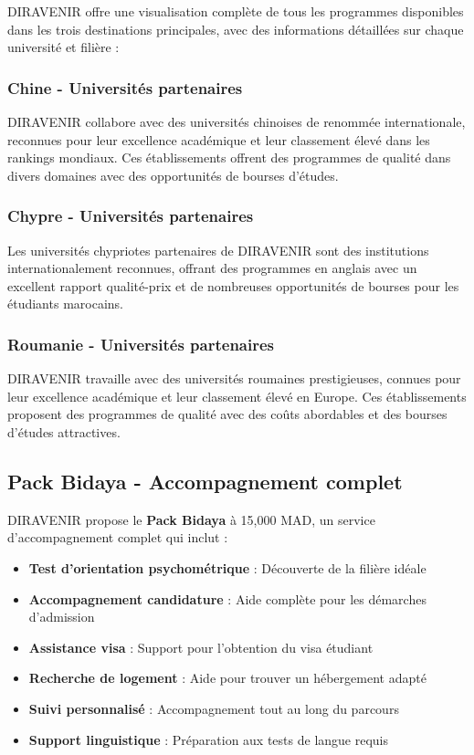 \documentclass[12pt,a4paper]{report}
\begin{document}
DIRAVENIR offre une visualisation complète de tous les programmes disponibles dans les trois destinations principales, avec des informations détaillées sur chaque université et filière :

\subsubsection{Chine - Universités partenaires}

DIRAVENIR collabore avec des universités chinoises de renommée internationale, reconnues pour leur excellence académique et leur classement élevé dans les rankings mondiaux. Ces établissements offrent des programmes de qualité dans divers domaines avec des opportunités de bourses d'études.

\subsubsection{Chypre - Universités partenaires}

Les universités chypriotes partenaires de DIRAVENIR sont des institutions internationalement reconnues, offrant des programmes en anglais avec un excellent rapport qualité-prix et de nombreuses opportunités de bourses pour les étudiants marocains.

\subsubsection{Roumanie - Universités partenaires}

DIRAVENIR travaille avec des universités roumaines prestigieuses, connues pour leur excellence académique et leur classement élevé en Europe. Ces établissements proposent des programmes de qualité avec des coûts abordables et des bourses d'études attractives.

\subsection{Pack Bidaya - Accompagnement complet}

DIRAVENIR propose le \textbf{Pack Bidaya }à 15,000 MAD, un service d'accompagnement complet qui inclut :

\begin{itemize}
    \item \textbf{Test d'orientation psychométrique} : Découverte de la filière idéale
    \item \textbf{Accompagnement candidature} : Aide complète pour les démarches d'admission
    \item \textbf{Assistance visa} : Support pour l'obtention du visa étudiant
    \item \textbf{Recherche de logement} : Aide pour trouver un hébergement adapté
    \item \textbf{Suivi personnalisé} : Accompagnement tout au long du parcours
    \item \textbf{Support linguistique} : Préparation aux tests de langue requis
\end{itemize}
\end{document}
